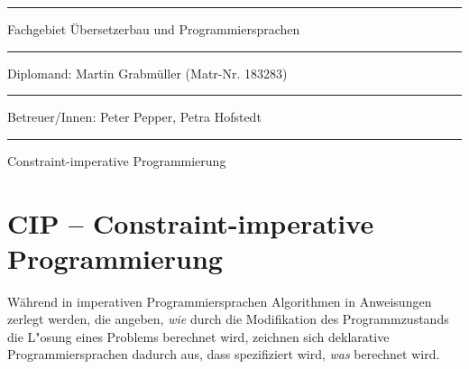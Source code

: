 


\hrule

\vspace*{2mm}

\noindent Fachgebiet \"Ubersetzerbau und Programmiersprachen 

\vspace*{2mm}

\hrule

\vspace*{2mm}

\noindent Diplomand: Martin Grabm\"uller (Matr-Nr. 183283)

\vspace*{2mm}

\hrule

\vspace*{2mm}

\noindent Betreuer/Innen: Peter Pepper, Petra Hofstedt

\vspace*{2mm}

\hrule

\vspace*{4mm}


\hspace*{5mm} 
\begin{minipage}[t]{0.85\linewidth}
Constraint-imperative Programmierung
\end{minipage} 
 
\section*{CIP -- Constraint-imperative Programmierung}

W\"ahrend in imperativen Programmiersprachen Algorithmen in
Anweisungen zerlegt werden, die angeben, {\em wie} durch die Modifikation
des Programmzustands die L"osung eines Problems berechnet wird, 
zeichnen sich deklarative Programmiersprachen dadurch aus,
dass spezifiziert wird, {\em was} berechnet wird.  

